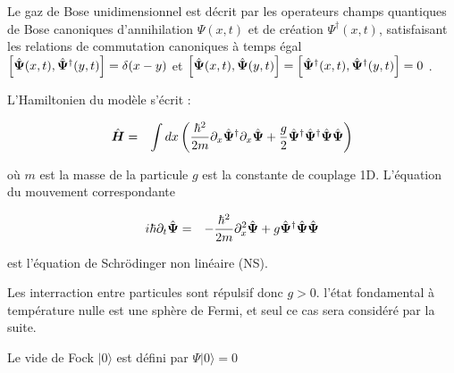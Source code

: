 Le gaz de Bose unidimensionnel est décrit par les operateurs champs quantiques de Bose canoniques  d'annihilation \( \Psi(x,t) \) et de création \( \Psi^\dag(x,t) \), satisfaisant les relations de commutation canoniques à temps égal $\left[ \hat{\bm{\Psi}}(x,t), \hat{\bm{\Psi}}^\dagger(y,t) \right] = \delta(x - y)$ et $ \left[ \hat{\bm{\Psi}}(x,t), \hat{\bm{\Psi}}(y,t) \right] = \left[ \hat{\bm{\Psi}}^\dag(x,t), \hat{\bm{\Psi}}^\dagger(y,t) \right] = 0$ . 







L’Hamiltonien du modèle s’écrit :

\begin{eqnarray*}
	\hat{\bm{H}} & = & \int dx \left( \frac{\hbar^2}{2m} \partial_x \hat{\bm{\Psi}}^\dagger \partial_x \hat{\bm{\Psi}} + \frac{g}2  \hat{\bm{\Psi}}^\dagger \hat{\bm{\Psi}}^\dagger \hat{\bm{\Psi}} \hat{\bm{\Psi}} \right)	
\end{eqnarray*}


où \( m \) est la masse de la particule \( g \) est la constante de couplage 1D.  L’équation du mouvement correspondante 

\begin{eqnarray*}
	i\hbar \partial_t \hat{\bm{\Psi}}  & = & -\frac{\hbar^2}{2m} \partial^2_x  \hat{\bm{\Psi}}  + g 	\hat{\bm{\Psi}}^\dag \hat{\bm{\Psi}} \hat{\bm{\Psi}}
\end{eqnarray*}

est l’équation de Schrödinger non linéaire (NS).

Les interraction entre particules sont répulsif donc $g > 0$. l’état fondamental à température nulle est une sphère de Fermi, et seul ce cas sera considéré par la suite.

Le vide de Fock \( |0\rangle \) est défini par $\Psi |0\rangle = 0$




